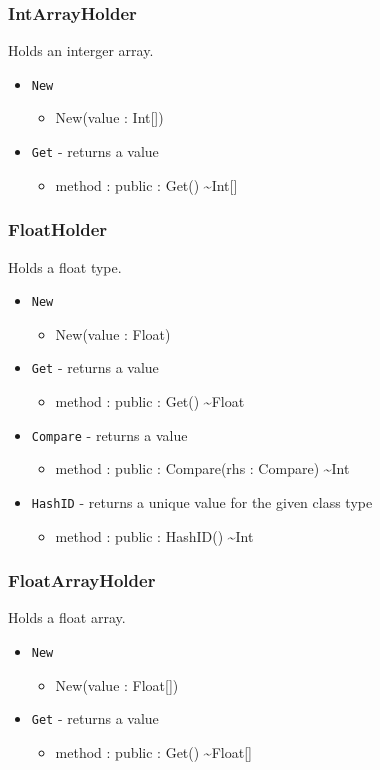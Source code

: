 \documentclass[11pt]{article}
\begin{document}
\subsubsection{IntArrayHolder}
Holds an interger array.
\begin{itemize}
\item \texttt{New}
  \begin{itemize}
  \item New(value : Int[])
  \end{itemize}
\item \texttt{Get} - returns a value
  \begin{itemize}
  \item method : public : Get() \textasciitilde Int[]
  \end{itemize}
\end{itemize}

\subsubsection{FloatHolder}
Holds a float type.
\begin{itemize}
\item \texttt{New}
  \begin{itemize}
  \item New(value : Float)
  \end{itemize}
\item \texttt{Get} - returns a value
  \begin{itemize}
  \item method : public : Get() \textasciitilde Float
  \end{itemize}
\item \texttt{Compare} - returns a value
  \begin{itemize}
  \item method : public : Compare(rhs : Compare) \textasciitilde Int
  \end{itemize}
\item \texttt{HashID} - returns a unique value for the given class
  type
  \begin{itemize}
  \item method : public : HashID() \textasciitilde Int
  \end{itemize}
\end{itemize}

\subsubsection{FloatArrayHolder}
Holds a float array.
\begin{itemize}
\item \texttt{New}
  \begin{itemize}
  \item New(value : Float[])
  \end{itemize}
\item \texttt{Get} - returns a value
  \begin{itemize}
  \item method : public : Get() \textasciitilde Float[]
  \end{itemize}
\end{itemize}
\end{document}
